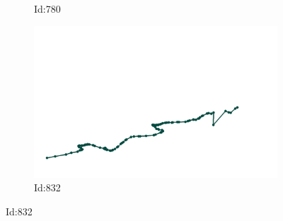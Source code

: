 \documentclass[12pt,twoside]{report}
\begin{document}
\begin{figure}
\begin{subfigure}[b]{0.20\textwidth}
\caption{Id:780}
\end{subfigure}
\begin{subfigure}[b]{0.20\textwidth}
\centering
\includegraphics[width=\textwidth]{../trajectories/832.png}
\caption{Id:832}
\end{subfigure}
\end{figure}
\end{document}
